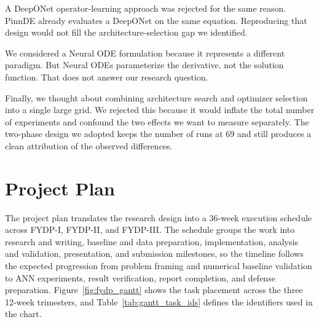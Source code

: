 A DeepONet operator-learning approach was rejected for the same reason. PinnDE already evaluates a DeepONet on the same equation. Reproducing that design would not fill the architecture-selection gap we identified.

We considered a Neural ODE formulation because it represents a different paradigm. But Neural ODEs parameterize the derivative, not the solution function. That does not answer our research question.

Finally, we thought about combining architecture search and optimizer selection into a single large grid. We rejected this because it would inflate the total number of experiments and confound the two effects we want to measure separately. The two-phase design we adopted keeps the number of runs at $69$ and still produces a clean attribution of the observed differences.

\section{Project Plan}

The project plan translates the research design into a 36-week execution schedule across FYDP-I, FYDP-II, and FYDP-III. The schedule groups the work into research and writing, baseline and data preparation, implementation, analysis and validation, presentation, and submission milestones, so the timeline follows the expected progression from problem framing and numerical baseline validation to ANN experiments, result verification, report completion, and defense preparation. Figure~\ref{fig:fydp_gantt} shows the task placement across the three 12-week trimesters, and Table~\ref{tab:gantt_task_ids} defines the identifiers used in the chart.

